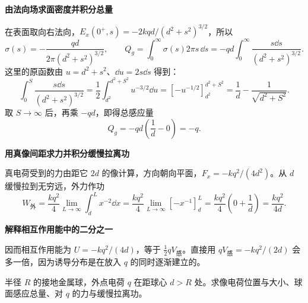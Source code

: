 \begin{solution}
{\begin{tikzpicture}
\end{tikzpicture}}



\par\medskip{}\noindent\textbf{由法向场求面密度并积分总量}\par\nobreak
在表面取向右法向，$E_x(0^+,s)=-2kqd/(d^2+s^2)^{3/2}$，所以
\[
 \sigma(s)=-\frac{qd}{2\pi(d^2+s^2)^{3/2}},\qquad
 Q_g=\int_0^\infty \sigma(s)2\pi s\,\dd s
=-qd\int_0^\infty\frac{s\dd s}{(d^2+s^2)^{3/2}}.
\]
这里的原函数由 $u=d^2+s^2$、$\dd u=2s\dd s$ 得到：
\[
 \int_0^S\frac{s\dd s}{(d^2+s^2)^{3/2}}
 =\frac12\int_{d^2}^{d^2+S^2}u^{-3/2}\dd u
 =[-u^{-1/2}]_{d^2}^{d^2+S^2}
 =\frac1d-\frac1{\sqrt{d^2+S^2}}.
\]
取 $S\to\infty$ 后，再乘 $-qd$，即得总感应量
\[
 Q_g=-qd\left(\frac1d-0\right)=-q.
\]


\par\medskip{}\noindent\textbf{用真像间距求力并积分缓慢拉离功}\par\nobreak
真电荷受到的力由距它 $2d$ 的像计算，方向朝向平面，$F_x=-kq^2/(4d^2)$。从 $d$ 缓慢拉到无穷远，外力作功
\[
 W_{\text{外}}=\frac{kq^2}{4}\lim_{L\to\infty}
 \int_d^Lx^{-2}\dd x
 =\frac{kq^2}{4}\lim_{L\to\infty}[-x^{-1}]_d^L
 =\frac{kq^2}{4}\left(0+\frac1d\right)=\frac{kq^2}{4d}.
\]


\par\medskip{}\noindent\textbf{解释相互作用能中的二分之一}\par\nobreak
因而相互作用能为 $U=-kq^2/(4d)$，等于 $\tfrac12qV_{\text{感}}$。直接用 $qV_{\text{感}}=-kq^2/(2d)$ 会多一倍，因为诱导分布是在放入 $q$ 的同时逐渐建立的。\end{solution}
\begin{question}\begin{example}\label{e3:example:8}
半径 $R$ 的接地金属球，外点电荷 $q$ 在距球心 $d>R$ 处。求像电荷位置与大小、球面感应总量、对 $q$ 的力与缓慢拉离功。
\end{example}
\end{question}
